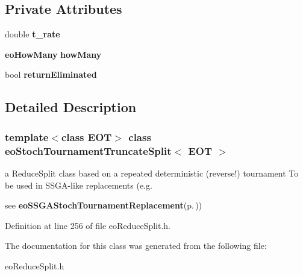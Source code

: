 \subsection*{Private Attributes}
\begin{CompactItemize}
\item 
double {\bf t\_\-rate}\label{classeo_stoch_tournament_truncate_split_r0}

\item 
{\bf eo\-How\-Many} {\bf how\-Many}\label{classeo_stoch_tournament_truncate_split_r1}

\item 
bool {\bf return\-Eliminated}\label{classeo_stoch_tournament_truncate_split_r2}

\end{CompactItemize}


\subsection{Detailed Description}
\subsubsection*{template$<$class EOT$>$ class eo\-Stoch\-Tournament\-Truncate\-Split$<$ EOT $>$}

a Reduce\-Split class based on a repeated deterministic (reverse!) tournament To be used in SSGA-like replacements (e.g. 

see {\bf eo\-SSGAStoch\-Tournament\-Replacement}{\rm (p.\,\pageref{classeo_s_s_g_a_stoch_tournament_replacement})}) 



Definition at line 256 of file eo\-Reduce\-Split.h.

The documentation for this class was generated from the following file:\begin{CompactItemize}
\item 
eo\-Reduce\-Split.h\end{CompactItemize}
